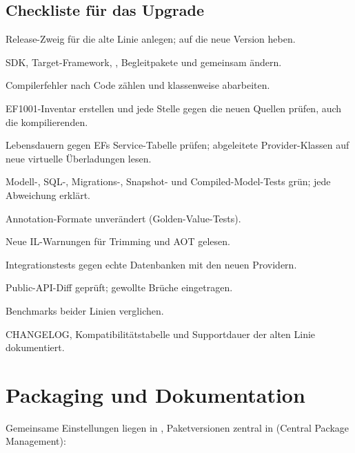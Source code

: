 \section{Checkliste für das Upgrade}

\begin{checklist}
  \item Release-Zweig für die alte Linie anlegen;  auf die neue Version heben.
  \item SDK, Target-Framework, , Begleitpakete und
     gemeinsam ändern.
  \item Compilerfehler nach Code zählen und klassenweise abarbeiten.
  \item EF1001-Inventar erstellen und jede Stelle gegen die neuen Quellen prüfen, auch die
    kompilierenden.
  \item Lebensdauern gegen EFs Service-Tabelle prüfen; abgeleitete Provider-Klassen auf neue
    virtuelle Überladungen lesen.
  \item Modell-, SQL-, Migrations-, Snapshot- und Compiled-Model-Tests grün; jede Abweichung
    erklärt.
  \item Annotation-Formate unverändert (Golden-Value-Tests).
  \item Neue IL-Warnungen für Trimming und AOT gelesen.
  \item Integrationstests gegen echte Datenbanken mit den neuen Providern.
  \item Public-API-Diff geprüft; gewollte Brüche eingetragen.
  \item Benchmarks beider Linien verglichen.
  \item CHANGELOG, Kompatibilitätstabelle und Supportdauer der alten Linie dokumentiert.
\end{checklist}

\chapter{Packaging und Dokumentation}\label{ch:packaging-and-documentation}

Gemeinsame Einstellungen liegen in ,
Paketversionen zentral in  (Central
Package Management):

